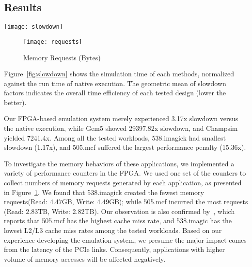 \documentclass[conference]{IEEEtran}
\begin{document}
\subsection{Results}
\begin{figure*}[htb]
  \centering
  \texttt{[image: slowdown]}
  \caption{Simulation Time Normalized against Native Execution}
  \label{fig:slowdown}
\end{figure*}

\begin{figure}[htb]
  \centering
  \texttt{[image: requests]}
  \caption{Memory Requests (Bytes)}
  \label{fig:requests}
\end{figure}
Figure~\ref{fig:slowdown} shows the simulation time of each methods, normalized against the run time of native execution.
The geometric mean of slowdown factors indicates the overall time efficiency of each tested design (lower the better).\par
Our FPGA-based emulation system merely experienced 3.17x slowdown versus the native execution, while Gem5 showed 29397.82x slowdown, and Champsim yielded 7241.4x.
Among all the tested workloads, 538.imagick had smallest slowdown (1.17x), and 505.mcf suffered the largest performance penalty (15.36x).\par
To investigate the memory behaviors of these applications, we implemented a variety of performance counters in the FPGA. We used one set of the counters to collect numbers of memory requests generated by each application, as presented in Figure~\ref{fig:requests}. We found that 538.imagick created the fewest memory requests(Read: 4.47GB, Write: 4.49GB); while 505.mcf incurred the most requests (Read: 2.83TB, Write: 2.82TB). Our observation is also confirmed by~\cite{spec2017-workload}, which reports that 505.mcf has the highest cache miss rate, and 538.imagic has the lowest L2/L3 cache miss rates among the tested workloads.
Based on our experience developing the emulation system, we presume the major impact comes from the latency of the PCIe links. Consequently, applications with higher volume of memory accesses will be affected negatively. 
\end{document}
